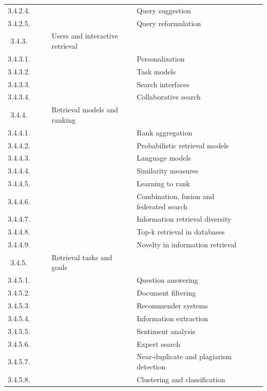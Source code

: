 \documentclass[12pt]{article}
\begin{document}
\begin{center}
{\begin{tabularx}{\linewidth}{|c|X|X|X|X|X|X|}
		3.4.2.4. &   &   &   &  Query suggestion &   &   \\
		3.4.2.5. &   &   &   &  Query reformulation &   &   \\
		3.4.3. &   &   &  Users and interactive retrieval &   &   &   \\
		3.4.3.1. &   &   &   &  Personalization &   &   \\
		3.4.3.2. &   &   &   &  Task models &   &   \\
		3.4.3.3. &   &   &   &  Search interfaces &   &   \\
		3.4.3.4. &   &   &   &  Collaborative search &   &   \\
		3.4.4. &   &   &  Retrieval models and ranking &   &   &   \\
		3.4.4.1. &   &   &   &  Rank aggregation &   &   \\
		3.4.4.2. &   &   &   &  Probabilistic retrieval models &   &   \\
		3.4.4.3. &   &   &   &  Language models &   &   \\
		3.4.4.4. &   &   &   &  Similarity measures &   &   \\
		3.4.4.5. &   &   &   &  Learning to rank &   &   \\
		3.4.4.6. &   &   &   &  Combination, fusion and federated search &   &   \\
		3.4.4.7. &   &   &   &  Information retrieval diversity &   &   \\
		3.4.4.8. &   &   &   &  Top-k retrieval in databases &   &   \\
		3.4.4.9. &   &   &   &  Novelty in information retrieval &   &   \\
		3.4.5. &   &   &  Retrieval tasks and goals &   &   &   \\
		3.4.5.1. &   &   &   &  Question answering &   &   \\
		3.4.5.2. &   &   &   &  Document filtering &   &   \\
		3.4.5.3. &   &   &   &  Recommender systems &   &   \\
		3.4.5.4. &   &   &   &  Information extraction &   &   \\
		3.4.5.5. &   &   &   &  Sentiment analysis &   &   \\
		3.4.5.6. &   &   &   &  Expert search &   &   \\
		3.4.5.7. &   &   &   &  Near-duplicate and plagiarism detection &   &   \\
		3.4.5.8. &   &   &   &  Clustering and classification &   &   \\

\end{tabularx}}
\end{center}
\end{document}
